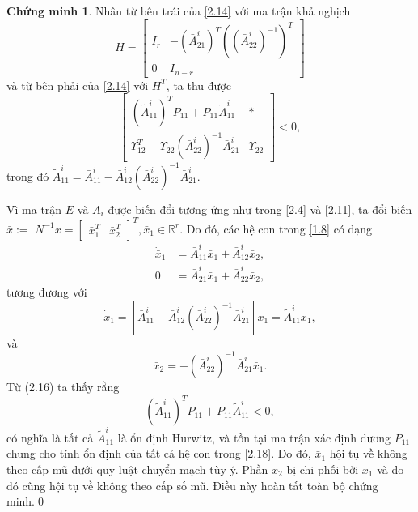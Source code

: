 \documentclass[12pt,a4paper]{report}
\theoremstyle{definition}
\newtheorem*{cv}{Chứng minh}
\theoremstyle{definition}
\numberwithin{dl}{chapter}
\numberwithin{vd}{chapter}
\numberwithin{corollary}{chapter}
\numberwithin{lemma}{chapter}
\numberwithin{md}{chapter}
\numberwithin{dn}{chapter}
\numberwithin{cy}{chapter}
\numberwithin{nx}{chapter}
\begin{document}
\begin{cv}
Nhân từ bên trái của \eqref{2.14} với ma trận khả nghịch
$$
H=\left[\begin{array}{cc}
I_{r} & -\left(\bar{A}_{21}^{i}\right)^{T}\left(\left(\bar{A}_{22}^{i}\right)^{-1}\right)^{T} \\
0 & I_{n-r}
\end{array}\right]
$$
và từ bên phải của \eqref{2.14} với $H^T$, ta thu được
\begin{equation}\label{2.16}
\left[\begin{array}{cc}
\left(\tilde{A}_{11}^{i}\right)^{T} P_{11}+P_{11} \tilde{A}_{11}^{i} & * \\
\Upsilon_{12}^{T}-\Upsilon_{22}\left(\bar{A}_{22}^{i}\right)^{-1} \bar{A}_{21}^{i} & \Upsilon_{22}
\end{array}\right]<0, 
\end{equation}
trong đó $\tilde{A}_{11}^{i}=\bar{A}_{11}^{i}-\bar{A}_{12}^{i}\left(\bar{A}_{22}^{i}\right)^{-1} \bar{A}_{21}^{i}$.

Vì ma trận $E$ và $A_{i}$ được biến đổi tương ứng như trong \eqref{2.4} và \eqref{2.11}, ta đổi biến $\bar{x}:=$ $N^{-1} x=\left[\begin{array}{ll}\bar{x}_{1}^{T} & \bar{x}_{2}^{T}\end{array}\right]^{T}, \bar{x}_{1} \in \mathbb{R}^{r}$. Do đó, các hệ con trong \eqref{1.8} có dạng
\begin{equation}\label{2.17}
\begin{aligned}
\dot{\bar{x}}_{1} &=\bar{A}_{11}^{i} \bar{x}_{1}+\bar{A}_{12}^{i} \bar{x}_{2}, \\
0 &=\bar{A}_{21}^{i} \bar{x}_{1}+\bar{A}_{22}^{i} \bar{x}_{2},
\end{aligned} 
\end{equation}
tương đương với
\begin{equation}\label{2.18}
\dot{\bar{x}}_{1}=\left[\bar{A}_{11}^{i}-\bar{A}_{12}^{i}\left(\bar{A}_{22}^{i}\right)^{-1} \bar{A}_{21}^{i}\right] \bar{x}_{1}=\tilde{A}_{11}^{i} \bar{x}_{1},
\end{equation}
và
$$
\bar{x}_{2}=-\left(\bar{A}_{22}^{i}\right)^{-1} \bar{A}_{21}^{i} \bar{x}_{1}.
$$
Từ (2.16) ta thấy rằng
\begin{equation}\label{2.19}
\left(\tilde{A}_{11}^{i}\right)^{T} P_{11}+P_{11} \tilde{A}_{11}^{i}<0, 
\end{equation}
có nghĩa là tất cả $\tilde{A}_{11}^{i}$ là ổn định Hurwitz, và tồn tại ma trận  xác định dương $P_{11}$ chung cho tính ổn định của tất cả hệ con trong \eqref{2.18}. Do đó, $\bar{x}_{1}$ hội tụ về không theo cấp mũ dưới quy luật chuyển mạch tùy ý. Phần $\bar{x}_{2}$ bị chi phối bởi  $\bar{x}_{1}$ và do đó cũng hội tụ về không theo cấp số mũ. Điều này hoàn tất toàn bộ chứng minh.\qed \\
\end{cv}
\end{document}

